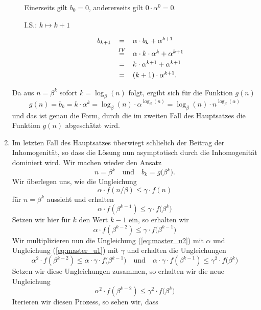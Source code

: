 \begin{enumerate}
\begin{enumerate}
             Einerseits gilt $b_0 = 0$, andererseits gilt $0 \cdot \alpha^0 = 0$.

\item[I.S.:] $k \mapsto k+1$

            \[
            \begin{array}[t]{lcl}
              b_{k+1} &               =  & \alpha \cdot b_k + \alpha^{k+1}              \\[0.1cm] 
                      & \stackrel{IV}{=} & \alpha \cdot k \cdot \alpha^k + \alpha^{k+1} \\[0.1cm]  
                      &               =  & k \cdot \alpha^{k+1} + \alpha^{k+1}          \\[0.1cm] 
                      &               =  & (k + 1) \cdot \alpha^{k+1}. 
            \end{array}
            \]
\end{enumerate}
Da aus $n = \beta^k$ sofort $k = \log_\beta(n)$ folgt, ergibt sich f\"ur die Funktion
$g(n)$ 
\[ g(n) = b_k = k \cdot \alpha^k = \log_\beta(n) \cdot \alpha^{\log_\beta(n)} = \log_\beta(n) \cdot
n^{\log_\beta(\alpha)} \]
und das ist genau die Form, durch die im zweiten Fall des Hauptsatzes die Funktion
$g(n)$ abgesch\"atzt wird.
\item
Im letzten Fall des Hauptsatzes \"uberwiegt schlie\3lich der Beitrag der Inhomogenit\"at, so dass die L\"osung 
nun asymptotisch durch die Inhomogenit\"at dominiert wird.
Wir machen wieder den Ansatz 
\[ n = \beta^k \quad \mbox{und} \quad b_k = g\bigl(\beta^k\bigr). \]
Wir \"uberlegen uns, wie die Ungleichung 
\[ \alpha \cdot f\left(n/\beta\right) \leq \gamma \cdot f(n) \]
f\"ur $n = \beta^k$ aussieht und erhalten
\begin{equation}
  \label{eq:master_u1}
 \alpha \cdot f\left(\beta^{k-1}\right) \leq \gamma \cdot f\bigl(\beta^k\bigr) 
\end{equation}
Setzen wir hier f\"ur $k$ den Wert $k-1$ ein, so erhalten wir
\begin{equation}
  \label{eq:master_u2}
 \alpha \cdot f\left(\beta^{k-2}\right) \leq \gamma \cdot f\bigl(\beta^{k-1}\bigr) 
\end{equation}
Wir multiplizieren nun die Ungleichung (\ref{eq:master_u2}) mit $\alpha$ und
Ungleichung (\ref{eq:master_u1}) mit $\gamma$ und erhalten die Ungleichungen
\[ \alpha^2 \cdot f\left(\beta^{k-2}\right) \leq \alpha \cdot \gamma \cdot f\bigl(\beta^{k-1}\bigr) 
   \quad \mbox{und} \quad
   \alpha \cdot \gamma \cdot f\left(\beta^{k-1}\right) \leq \gamma^2 \cdot f\bigl(\beta^k\bigr) 
\]
Setzen wir diese Ungleichungen zusammen, so erhalten wir die neue Ungleichung
\[ \alpha^2 \cdot f\left(\beta^{k-2}\right) \leq \gamma^2 \cdot f\bigl(\beta^k\bigr) \]
Iterieren wir diesen Prozess, so sehen wir, dass 


\end{enumerate}
